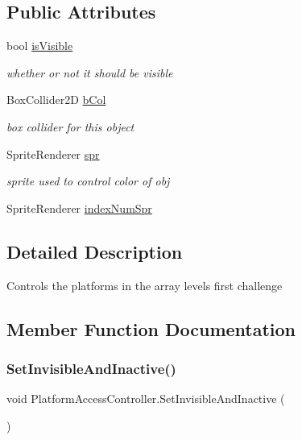 \subsection*{Public Attributes}
\begin{DoxyCompactItemize}
\item 
bool \hyperlink{class_platform_access_controller_ae61d142d689e9436ffcdd42ae258b74b}{is\+Visible}
\begin{DoxyCompactList}\small\item\em whether or not it should be visible \end{DoxyCompactList}\item 
Box\+Collider2D \hyperlink{class_platform_access_controller_a7e71633a42a42bd944656b6b31da7018}{b\+Col}
\begin{DoxyCompactList}\small\item\em box collider for this object \end{DoxyCompactList}\item 
Sprite\+Renderer \hyperlink{class_platform_access_controller_a148223f08e156ce2c3cbf9b87feb83d2}{spr}
\begin{DoxyCompactList}\small\item\em sprite used to control color of obj \end{DoxyCompactList}\item 
Sprite\+Renderer \hyperlink{class_platform_access_controller_a96b290b37dd60e9c78015b86c94ffbe7}{index\+Num\+Spr}
\end{DoxyCompactItemize}


\subsection{Detailed Description}
Controls the platforms in the array level\textquotesingle{}s first challenge 

\subsection{Member Function Documentation}
\mbox{\label{class_platform_access_controller_adae7a500e267262f6262b9997fb7e9d4}} 
\subsubsection{\texorpdfstring{Set\+Invisible\+And\+Inactive()}{SetInvisibleAndInactive()}}
{\footnotesize\ttfamily void Platform\+Access\+Controller.\+Set\+Invisible\+And\+Inactive (\begin{DoxyParamCaption}{ }\end{DoxyParamCaption})}



